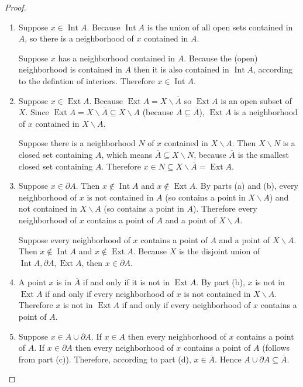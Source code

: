 \begin{proof}
	\begin{enumerate}[label={(\alph*)}]
		\item Suppose $x\in \operatorname{Int} A$. Because $\operatorname{Int} A$ is the union of all open sets contained in $A$, so there is a neighborhood of $x$ contained in $A$.

		      Suppose $x$ has a neighborhood contained in $A$. Because the (open) neighborhood is contained in $A$ then it is also contained in $\operatorname{Int} A$, according to the defintion of interiors. Therefore $x\in \operatorname{Int} A$.
		\item Suppose $x\in \operatorname{Ext} A$. Because $\operatorname{Ext} A = X\smallsetminus \overline{A}$ so $\operatorname{Ext} A$ is an open subset of $X$. Since $\operatorname{Ext} A = X\smallsetminus \overline{A}\subseteq X\smallsetminus A$ (because $A\subseteq \overline{A}$), $\operatorname{Ext} A$ is a neighborhood of $x$ contained in $X\smallsetminus A$.

		      Suppose there is a neighborhood $N$ of $x$ contained in $X\smallsetminus A$. Then $X\smallsetminus N$ is a closed set containing $A$, which means $\overline{A}\subseteq X\smallsetminus N$, because $\overline{A}$ is the smallest closed set containing $A$. Therefore $x\in N\subseteq X\smallsetminus\overline{A} = \operatorname{Ext} A$.
		\item Suppose $x\in \partial A$. Then $x\notin\operatorname{Int} A$ and $x\notin\operatorname{Ext} A$. By parts (a) and (b), every neighborhood of $x$ is not contained in $A$ (so contains a point in $X\smallsetminus A$) and not contained in $X\smallsetminus A$ (so contains a point in $A$). Therefore every neighborhood of $x$ contains a point of $A$ and a point of $X\smallsetminus A$.

		      Suppose every neighborhood of $x$ contains a point of $A$ and a point of $X\smallsetminus A$. Then $x\notin \operatorname{Int} A$ and $x\notin \operatorname{Ext} A$. Because $X$ is the disjoint union of $\operatorname{Int}A, \partial A, \operatorname{Ext}A$, then $x\in\partial A$.
		\item A point $x$ is in $\overline{A}$ if and only if it is not in $\operatorname{Ext} A$. By part (b), $x$ is not in $\operatorname{Ext} A$ if and only if every neighborhood of $x$ is not contained in $X\smallsetminus A$. Therefore $x$ is not in $\operatorname{Ext} A$ if and only if every neighborhood of $x$ contains a point of $A$.

		\item Suppose $x\in A\cup\partial A$. If $x\in A$ then every neighborhood of $x$ contains a point of $A$. If $x\in \partial A$ then every neighborhood of $x$ contains a point of $A$ (follows from part (c)). Therefore, according to part (d), $x\in\overline{A}$. Hence $A\cup\partial A\subseteq \overline{A}$.


\end{enumerate}
\end{proof}
